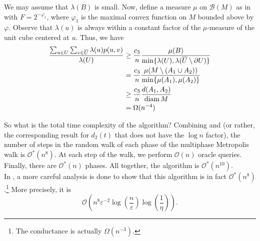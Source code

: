 We may assume that $\lambda(B)$ is small.
Now, define a measure $\mu$ on $\mathcal{B}(M)$ as in  with $F=2^{-\varphi_1}$, where $\varphi_1$ is the maximal convex function on $M$ bounded above by $\varphi$. Observe that $\lambda(u)$ is always within a constant factor of the $\mu$-measure of the unit cube centered at $u$. Thus, we have
\begin{align}
	\frac{\sum_{u\in U} \sum_{v\in\overline{U}} \lambda(u)p(u,v)}{\lambda(U)} &\geq \frac{c_3}{n}\frac{\mu(B)}{\min\{\lambda(U),\lambda(\overline{U}\setminus\partial U)\}} \nonumber \\ %
	&= \frac{c_3}{n}\frac{\mu(M \setminus (A_1\cup A_2))}{\min\{\mu(A_1),\mu(A_2)\}} \nonumber \\
	&\geq \frac{c_3}{n} \frac{d(A_1,A_2)}{\diam M} \nonumber \\
	&= \Omega(n^{-4}) \label{eqn: number of steps}
\end{align}

So what is the total time complexity of the algorithm? Combining  and  (or rather, the corresponding result for $d_2(t)$ that does not have the $\log n$ factor), the number of steps in the random walk of each phase of the multiphase Metropolis walk is $\mathcal{O}^*(n^{8})$. At each step of the walk, we perform $\mathcal{O}(n)$ oracle queries. Finally, there are $\mathcal{O}^*(n)$ phases. All together, the algorithm is $\mathcal{O}^*(n^{10})$.\\

In \cite{dyer-frieze-sample-outside}, a more careful analysis is done to show that this algorithm is in fact $\mathcal{O}^*(n^{8})$.\footnote{The conductance is actually $\Omega(n^{-3})$.} More precisely, it is
\[ \mathcal{O}\left(n^8\varepsilon^{-2}\log\left(\frac{n}{\varepsilon}\right)\log\left(\frac{1}{\eta}\right)\right). \]


